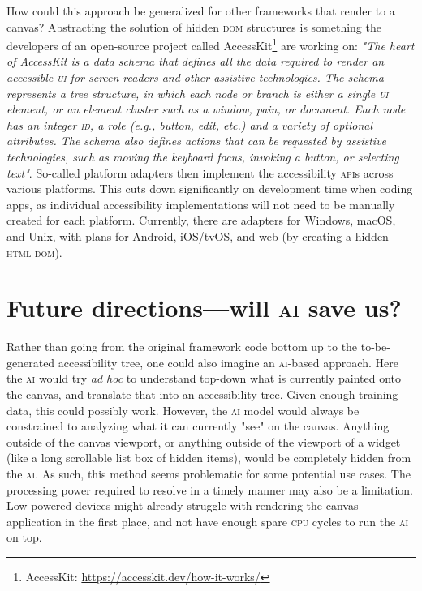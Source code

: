 \documentclass[sigconf]{acmart}
\begin{document}
How could this approach be generalized for other frameworks that render to a canvas? Abstracting the solution of hidden \textsc{dom} structures is something the developers of an open-source project called AccessKit\footnote{AccessKit: \url{https://accesskit.dev/how-it-works/}} are working on: \textit{"The heart of AccessKit is a data schema that defines all the data required to render an accessible \textsc{ui} for screen readers and other assistive technologies. The schema represents a tree structure, in which each node or branch is either a single \textsc{ui} element, or an element cluster such as a window, pain, or document. Each node has an integer \textsc{id}, a role (\textit{e.g.}, button, edit, etc.) and a variety of optional attributes. The schema also defines actions that can be requested by assistive technologies, such as moving the keyboard focus, invoking a button, or selecting text"}. So-called platform adapters then implement the accessibility \textsc{api}s across various platforms. This cuts down significantly on development time when coding apps, as individual accessibility implementations will not need to be manually created for each platform. Currently, there are adapters for Windows, mac\textsc{OS}, and Unix, with plans for Android, i\textsc{OS}/tv\textsc{OS}, and web (by creating a hidden \textsc{html dom}).

\section{Future directions---will \textsc{ai} save us?}

Rather than going from the original framework code bottom up to the to-be-generated accessibility tree, one could also imagine an \textsc{ai}-based approach. Here the \textsc{ai} would try \textit{ad hoc} to understand top-down what is currently painted onto the canvas, and translate that into an accessibility tree. Given enough training data, this could possibly work. However, the \textsc{ai} model would always be constrained to analyzing what it can currently "see" on the canvas. Anything outside of the canvas viewport, or anything outside of the viewport of a widget (like a long scrollable list box of hidden items), would be completely hidden from the \textsc{ai}. As such, this method seems problematic for some potential use cases. The processing power required to resolve in a timely manner may also be a limitation. Low-powered devices might already struggle with rendering the canvas application in the first place, and not have enough spare \textsc{cpu} cycles to run the \textsc{ai} on top. 
\end{document}
